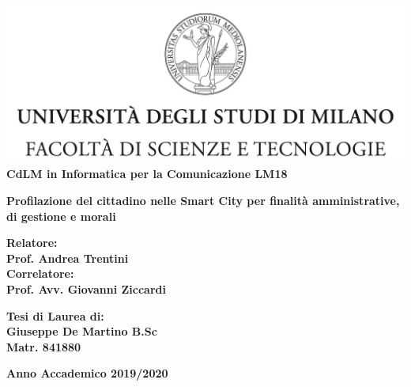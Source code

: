 \begin{titlepage}
\begin{center}
\includegraphics[width=\textwidth]{img/Logo.jpg}\\
{\large{\bf CdLM in Informatica per la Comunicazione LM18}}
\end{center}
\vspace{12mm}
\begin{center}
{\huge{\bf  Profilazione del cittadino nelle Smart City per finalità amministrative, di gestione e morali}}\\
\vspace{4mm}
\vspace{4mm}
\end{center}
\vspace{12mm}

\begin{flushleft}
{\large{\bf Relatore:}}\\
{\large{\bf Prof. Andrea Trentini}}\\
\vspace{4mm}
{\large{\bf Correlatore:}}\\
{\large{\bf Prof. Avv. Giovanni Ziccardi}}\\
\end{flushleft}
\vspace{12mm}
\begin{flushright}
{\large{\bf Tesi di Laurea di:}}\\
{\large{\bf Giuseppe De Martino B.Sc}}\\
{\large{\bf Matr. 841880}}\\
\end{flushright}

\vspace{18mm}
\begin{center}
{\large{\bf Anno Accademico 2019/2020}}
\end{center}
\end{titlepage}